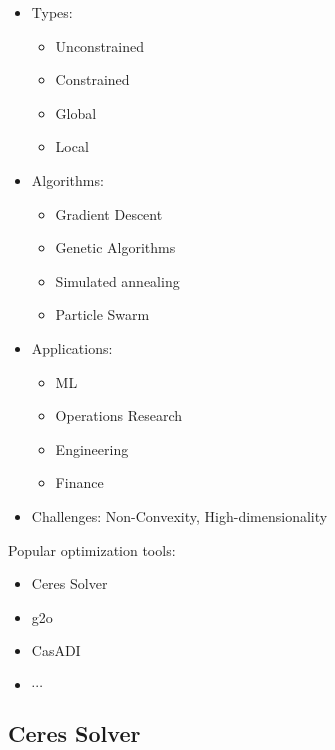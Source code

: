 \begin{itemize}
        \item Types:
            \begin{itemize}
                    \item Unconstrained
                    \item Constrained
                    \item Global
                    \item Local

                    
            \end{itemize}
        \item Algorithms:
            \begin{itemize}
                    \item Gradient Descent
                    \item Genetic Algorithms
                    \item Simulated annealing
                    \item Particle Swarm
                    
            \end{itemize}
        \item Applications:
            \begin{itemize}
                    \item ML
                    \item Operations Research
                    \item Engineering
                    \item Finance

                    
            \end{itemize}
        \item Challenges: Non-Convexity, High-dimensionality
       
        
\end{itemize}


Popular optimization tools:
\begin{itemize}
        \item Ceres Solver
        \item g2o
        \item CasADI
        \item $\cdots $
\end{itemize}


\subsection{Ceres Solver}

